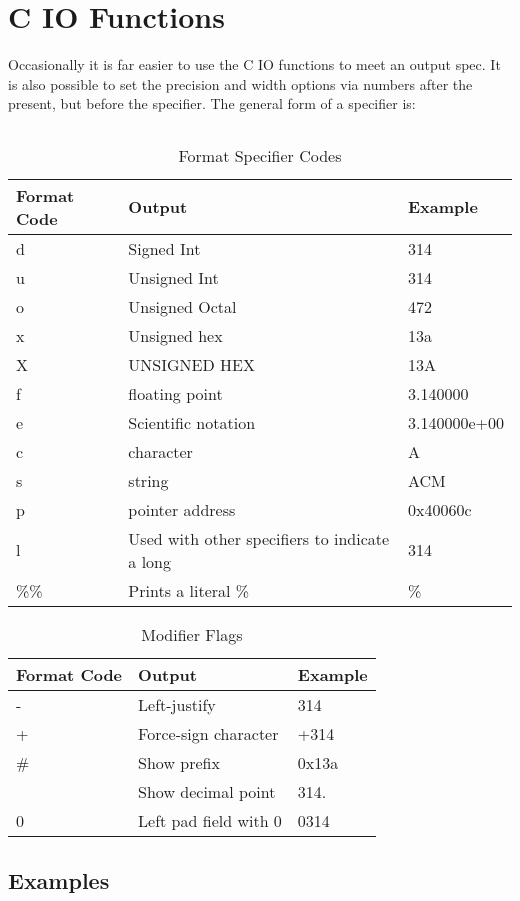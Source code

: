 \section{C IO Functions}
Occasionally it is far easier to use the C IO functions to meet an output spec. It is also possible to set the precision and width options via numbers after the present, but before the specifier.  The general form of a specifier is:

\begin{lstlisting}[label=format code format,caption=Format Codes for printf()]
%[flags][width][.precision][length]specifier
\end{lstlisting}

\begin{table}[h]
	\caption{Format Specifier Codes\cite{cplusplus}}
	\begin{tabularx}{\textwidth}{|l|X|l|} \hline
		Format Code &   Output              &   Example     \\ \hline
		d           &   Signed Int          &   314         \\
		u           &   Unsigned Int        &   314         \\
		o           &   Unsigned Octal      &   472         \\
		x           &   Unsigned hex        &   13a         \\
		X           &   UNSIGNED HEX        &   13A         \\
		f           &   floating point      &   3.140000    \\
		e           &   Scientific notation &   3.140000e+00\\
		c           &   character           &   A           \\
		s           &   string              &   ACM         \\
		p           &   pointer address     &   0x40060c    \\
		l           &   Used with other specifiers to indicate a long & 314 \\
		\%\%        &   Prints a literal \% &   \%          \\
		\hline
	\end{tabularx}
\end{table}

\begin{table}[h]
	\caption{Modifier Flags \cite{cplusplus}}
	\begin{tabularx}{\textwidth}{|l|X|l|} \hline
		Format Code &   Output                  &   Example    \\ \hline
		-           &   Left-justify            &   314        \\
		+           &   Force-sign character    &   +314       \\
		\#          &   Show prefix             &   0x13a      \\
			  &   Show decimal point      &   314.       \\
		0           &   Left pad field with 0   &   0314       \\
		\hline
	\end{tabularx}
\end{table}

\subsection{Examples}
